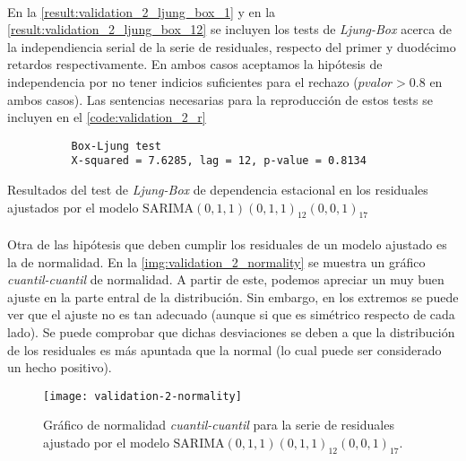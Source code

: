 \documentclass[a4paper, spanish]{article}
\begin{document}
      \paragraph{}
      En la \autoref{result:validation_2_ljung_box_1} y en la \autoref{result:validation_2_ljung_box_12} se incluyen los tests de \emph{Ljung-Box} acerca de la independiencia serial de la serie de residuales, respecto del primer y duodécimo retardos respectivamente. En ambos casos aceptamos la hipótesis de independencia por no tener indicios suficientes para el rechazo ($pvalor > 0.8$ en ambos casos). Las sentencias necesarias para la reproducción de estos tests se incluyen en el \autoref{code:validation_2_r}

      \begin{table}[htb!]
        \begin{Verbatim}
          Box-Ljung test
          X-squared = 7.6285, lag = 12, p-value = 0.8134
        \end{Verbatim}
        \caption{Resultados del test de \emph{Ljung-Box} de dependencia estacional en los residuales ajustados por el modelo $\text{SARIMA}(0, 1, 1)(0, 1, 1)_{12}(0, 0, 1)_{17}$}
        \label{result:validation_2_ljung_box_12}
      \end{table}

      \paragraph{}
      Otra de las hipótesis que deben cumplir los residuales de un modelo ajustado es la de normalidad. En la \autoref{img:validation_2_normality} se muestra un gráfico \emph{cuantil-cuantil} de normalidad. A partir de este, podemos apreciar un muy buen ajuste en la parte entral de la distribución. Sin embargo, en los extremos se puede ver que el ajuste no es tan adecuado (aunque si que es simétrico respecto de cada lado). Se puede comprobar que dichas desviaciones se deben a que la distribución de los residuales es más apuntada que la normal (lo cual puede ser considerado un hecho positivo).

      \begin{figure}[htb!]
        \centering
        \texttt{[image: validation-2-normality]}
        \caption{Gráfico de normalidad \emph{cuantil-cuantil} para la serie de residuales ajustado por el modelo $\text{SARIMA}(0, 1, 1)(0, 1, 1)_{12}(0, 0, 1)_{17}$.}
        \label{img:validation_2_normality}
      \end{figure}
\end{document}
